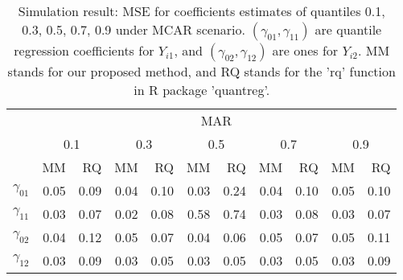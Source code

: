 \documentclass[12pt]{article}
\begin{document}
\begin{table}
  \renewcommand{\arraystretch}{1.3}
  \centering
  \caption{Simulation result: MSE for coefficients estimates of quantiles
    0.1, 0.3, 0.5, 0.7, 0.9 under MCAR scenario. $(\gamma_{01}, \gamma_{11})$ 
    are quantile regression coefficients for $Y_{i1}$, and $(\gamma_{02}, \gamma_{12})$ 
    are ones for $Y_{i2}$. MM stands for our proposed method, and RQ stands for the 'rq' 
    function in R package 'quantreg'.}
  \vspace{10pt}
  \begin{tabular}{rrrrrrrrrrr}
    \toprule
    & \multicolumn{ 10}{c}{MAR} \\
    \cline{2-11}
    &  \multicolumn{2}{c}{0.1} &  \multicolumn{2}{c}{0.3} &  \multicolumn{2}{c}{0.5} 
&  \multicolumn{2}{c}{0.7} &  \multicolumn{2}{c}{0.9} \\
    \cline{2-11}
    & MM & RQ    & MM & RQ    & MM & RQ    & MM & RQ    & MM & RQ \\
    \hline
    $\gamma_{01}$ &  0.05 &0.09& 0.04  &0.10 &0.03 &0.24 &0.04 &0.10 &0.05 &0.10 \\
    $\gamma_{11}$ &  0.03 &0.07&  0.02 &0.08 &0.58 &0.74 &0.03 &0.08 &0.03 &0.07 \\ 
    $\gamma_{02}$ & 0.04  &0.12&  0.05 &0.07 &0.04 &0.06 &0.05 &0.07 &0.05 &0.11 \\ 
    $\gamma_{12}$ &  0.03 & 0.09& 0.03 &0.05 &0.03 &0.05 &0.03 &0.05 &0.03 &0.09 \\ 
    \bottomrule
  \end{tabular}  \label{tab:sim}
\end{table}
\end{document}

